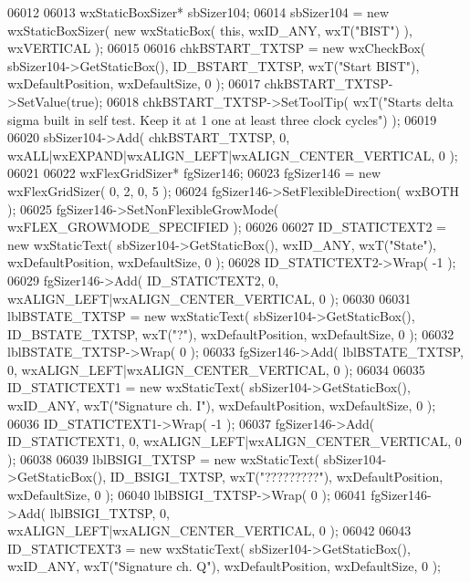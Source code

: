 \begin{DoxyCode}
06012     
06013     wxStaticBoxSizer* sbSizer104;
06014     sbSizer104 = \textcolor{keyword}{new} wxStaticBoxSizer( \textcolor{keyword}{new} wxStaticBox( \textcolor{keyword}{this}, wxID\_ANY, wxT(\textcolor{stringliteral}{"BIST"}) ), wxVERTICAL );
06015     
06016     chkBSTART_TXTSP = \textcolor{keyword}{new} wxCheckBox( sbSizer104->GetStaticBox(), 
      ID_BSTART_TXTSP, wxT(\textcolor{stringliteral}{"Start BIST"}), wxDefaultPosition, wxDefaultSize, 0 );
06017     chkBSTART_TXTSP->SetValue(\textcolor{keyword}{true}); 
06018     chkBSTART_TXTSP->SetToolTip( wxT(\textcolor{stringliteral}{"Starts delta sigma built in self test. Keep it at 1 one at least
       three clock cycles"}) );
06019     
06020     sbSizer104->Add( chkBSTART_TXTSP, 0, wxALL|wxEXPAND|wxALIGN\_LEFT|wxALIGN\_CENTER\_VERTICAL, 0 );
06021     
06022     wxFlexGridSizer* fgSizer146;
06023     fgSizer146 = \textcolor{keyword}{new} wxFlexGridSizer( 0, 2, 0, 5 );
06024     fgSizer146->SetFlexibleDirection( wxBOTH );
06025     fgSizer146->SetNonFlexibleGrowMode( wxFLEX\_GROWMODE\_SPECIFIED );
06026     
06027     ID_STATICTEXT2 = \textcolor{keyword}{new} wxStaticText( sbSizer104->GetStaticBox(), wxID\_ANY, wxT(\textcolor{stringliteral}{"State"}), 
      wxDefaultPosition, wxDefaultSize, 0 );
06028     ID_STATICTEXT2->Wrap( -1 );
06029     fgSizer146->Add( ID_STATICTEXT2, 0, wxALIGN\_LEFT|wxALIGN\_CENTER\_VERTICAL, 0 );
06030     
06031     lblBSTATE_TXTSP = \textcolor{keyword}{new} wxStaticText( sbSizer104->GetStaticBox(), 
      ID_BSTATE_TXTSP, wxT(\textcolor{stringliteral}{"?"}), wxDefaultPosition, wxDefaultSize, 0 );
06032     lblBSTATE_TXTSP->Wrap( 0 );
06033     fgSizer146->Add( lblBSTATE_TXTSP, 0, wxALIGN\_LEFT|wxALIGN\_CENTER\_VERTICAL, 0 );
06034     
06035     ID_STATICTEXT1 = \textcolor{keyword}{new} wxStaticText( sbSizer104->GetStaticBox(), wxID\_ANY, wxT(\textcolor{stringliteral}{"Signature ch. I"}), 
      wxDefaultPosition, wxDefaultSize, 0 );
06036     ID_STATICTEXT1->Wrap( -1 );
06037     fgSizer146->Add( ID_STATICTEXT1, 0, wxALIGN\_LEFT|wxALIGN\_CENTER\_VERTICAL, 0 );
06038     
06039     lblBSIGI_TXTSP = \textcolor{keyword}{new} wxStaticText( sbSizer104->GetStaticBox(), 
      ID_BSIGI_TXTSP, wxT(\textcolor{stringliteral}{"?????????"}), wxDefaultPosition, wxDefaultSize, 0 );
06040     lblBSIGI_TXTSP->Wrap( 0 );
06041     fgSizer146->Add( lblBSIGI_TXTSP, 0, wxALIGN\_LEFT|wxALIGN\_CENTER\_VERTICAL, 0 );
06042     
06043     ID_STATICTEXT3 = \textcolor{keyword}{new} wxStaticText( sbSizer104->GetStaticBox(), wxID\_ANY, wxT(\textcolor{stringliteral}{"Signature ch. Q"}), 
      wxDefaultPosition, wxDefaultSize, 0 );

\end{DoxyCode}
